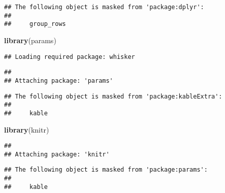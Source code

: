 \documentclass[]{article}
\newenvironment{Shaded}{\begin{snugshade}}{\end{snugshade}}
\newcommand{\KeywordTok}[1]{\textcolor[rgb]{0.13,0.29,0.53}{\textbf{#1}}}
\newcommand{\NormalTok}[1]{#1}
\begin{document}
\begin{verbatim}
## The following object is masked from 'package:dplyr':
## 
##     group_rows
\end{verbatim}

\begin{Shaded}
\begin{Highlighting}[]
\KeywordTok{library}\NormalTok{(params)}
\end{Highlighting}
\end{Shaded}

\begin{verbatim}
## Loading required package: whisker
\end{verbatim}

\begin{verbatim}
## 
## Attaching package: 'params'
\end{verbatim}

\begin{verbatim}
## The following object is masked from 'package:kableExtra':
## 
##     kable
\end{verbatim}

\begin{Shaded}
\begin{Highlighting}[]
\KeywordTok{library}\NormalTok{(knitr)}
\end{Highlighting}
\end{Shaded}

\begin{verbatim}
## 
## Attaching package: 'knitr'
\end{verbatim}

\begin{verbatim}
## The following object is masked from 'package:params':
## 
##     kable
\end{verbatim}
\end{document}
